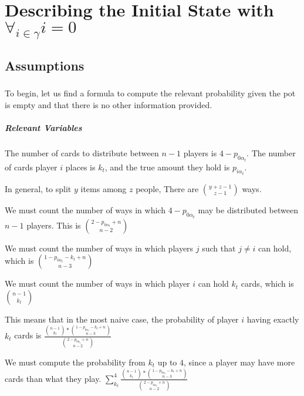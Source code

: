 \documentclass[letterpaper,11pt]{report}
\begin{document}
\chapter{Describing the Initial State with $\forall_{i\in\gamma} i = 0$}
\section{Assumptions} 
\paragraph*{} To begin, let us find a formula to compute the relevant probability given the pot is empty and that there is no other information provided.
\paragraph*{Relevant Variables} The number of cards to distribute between $n-1$ players is $4-p_{0 \alpha_{t}}$. The number of cards player $i$ places is $k_t$, and the true amount they hold is $p_{i \alpha_t}$.
\begin{description}
    \item In general, to split $y$ items among $z$ people, There are ${y+z-1 \choose z-1}$ ways.
    \item We must count the number of ways in which $4-p_{0 \alpha_{t}}$ may be distributed between $n-1$ players. This is ${2-p_{0 \alpha_{t}} + n \choose n-2}$
    \item We must count the number of ways in which players $j$ such that $j\neq i$ can hold, which is ${1-p_{0 \alpha_{t}} - k_t + n \choose n-3}$ 
    \item We must count the number of ways in which player $i$ can hold $k_t$ cards, which is ${n-1 \choose k_t}$
    \linebreak
    \item This means that in the most naive case, the probability of player $i$ having exactly $k_t$ cards is  $\frac{{n-1 \choose k_t}\ast{1-p_{0 \alpha_{t}} - k_t + n \choose n-3}}{{2-p_{0 \alpha_{t}} + n \choose n-2}}$
    \item We must compute the probability from $k_t$ up to $4$, since a player may have more cards than what they play. $\sum_{k_t}^{4} \frac{{n-1 \choose k_t}\ast{1-p_{0 \alpha_{t}} - k_t + n \choose n-3}}{{2-p_{0 \alpha_{t}} + n \choose n-2}}$ 
\end{description}
\end{document}
